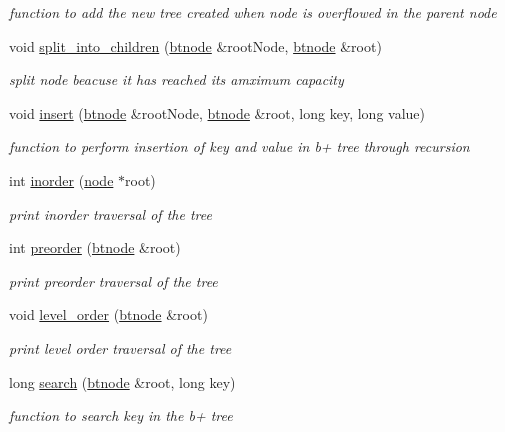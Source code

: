 \begin{DoxyCompactItemize}
\begin{DoxyCompactList}\small\item\em function to add the new tree created when node is overflowed in the parent node \end{DoxyCompactList}\item 
void \hyperlink{class_btreehash_1_1btree_adb6dfb996bad223f58bb8ea63dae6f4f}{split\-\_\-into\-\_\-children} (\hyperlink{namespace_btreehash_ac7db8bb3c794c446de540bf6a03955bc}{btnode} \&root\-Node, \hyperlink{namespace_btreehash_ac7db8bb3c794c446de540bf6a03955bc}{btnode} \&root)
\begin{DoxyCompactList}\small\item\em split node beacuse it has reached its amximum capacity \end{DoxyCompactList}\item 
void \hyperlink{class_btreehash_1_1btree_a4fac106992cdc66a959dad171843bec3}{insert} (\hyperlink{namespace_btreehash_ac7db8bb3c794c446de540bf6a03955bc}{btnode} \&root\-Node, \hyperlink{namespace_btreehash_ac7db8bb3c794c446de540bf6a03955bc}{btnode} \&root, long key, long value)
\begin{DoxyCompactList}\small\item\em function to perform insertion of key and value in b+ tree through recursion \end{DoxyCompactList}\item 
int \hyperlink{class_btreehash_1_1btree_a5f8a96959a69a613d08c5438037ac40d}{inorder} (\hyperlink{class_btreehash_1_1node}{node} $\ast$root)
\begin{DoxyCompactList}\small\item\em print inorder traversal of the tree \end{DoxyCompactList}\item 
int \hyperlink{class_btreehash_1_1btree_a8ca73a55e98ff281da3848c5e9a8de4c}{preorder} (\hyperlink{namespace_btreehash_ac7db8bb3c794c446de540bf6a03955bc}{btnode} \&root)
\begin{DoxyCompactList}\small\item\em print preorder traversal of the tree \end{DoxyCompactList}\item 
void \hyperlink{class_btreehash_1_1btree_a76f882b71f3bce80bdd98146e3fdc338}{level\-\_\-order} (\hyperlink{namespace_btreehash_ac7db8bb3c794c446de540bf6a03955bc}{btnode} \&root)
\begin{DoxyCompactList}\small\item\em print level order traversal of the tree \end{DoxyCompactList}\item 
long \hyperlink{class_btreehash_1_1btree_a7c11e6d57f8f4fbaaa5e1909f45e68c0}{search} (\hyperlink{namespace_btreehash_ac7db8bb3c794c446de540bf6a03955bc}{btnode} \&root, long key)
\begin{DoxyCompactList}\small\item\em function to search key in the b+ tree \end{DoxyCompactList}\end{DoxyCompactItemize}
